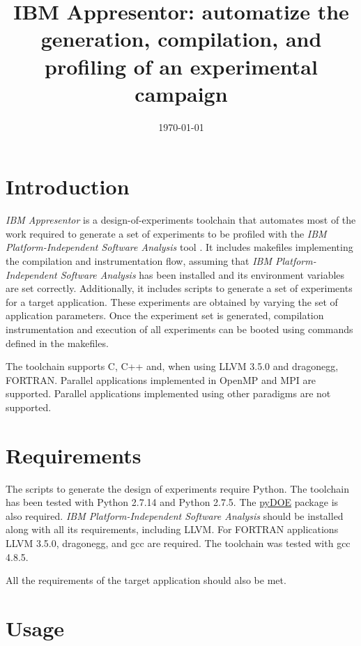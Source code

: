 \documentclass[a4paper, 10pt]{article}
\title{IBM Appresentor: automatize the generation, compilation, and profiling of an experimental campaign}
\date{\today}
\begin{document}
\maketitle

\tableofcontents


\section{Introduction}

\textit{IBM Appresentor} is a design-of-experiments toolchain that automates most of the work required to generate a set of experiments to be profiled with the \textit{IBM Platform-Independent Software Analysis} tool \cite{Anghel2016}. 
It includes makefiles implementing the compilation and instrumentation flow, assuming that \textit{IBM Platform-Independent Software Analysis} has been installed and
its environment variables are set correctly. Additionally, it includes scripts to generate a set of experiments for a target application.
These experiments are obtained by
varying the set of application parameters.
Once the experiment set is generated, compilation instrumentation and execution of all experiments can be booted using commands defined in the makefiles.

The toolchain supports C, C++ and, when using LLVM 3.5.0 and dragonegg, FORTRAN.
Parallel applications implemented in OpenMP and MPI are supported.
Parallel applications implemented using other paradigms are not supported.

\section{Requirements}

The scripts to generate the design of experiments require Python. The toolchain has been
tested with Python 2.7.14 and Python 2.7.5. The \href{https://pythonhosted.org/pyDOE}{pyDOE} package is also required.
\textit{IBM Platform-Independent Software Analysis} should be installed along with all its requirements, including LLVM.
For FORTRAN applications LLVM 3.5.0, dragonegg, and gcc are required.
The toolchain was tested with gcc 4.8.5.

All the requirements of the target application should also be met.

\section{Usage}
\end{document}
